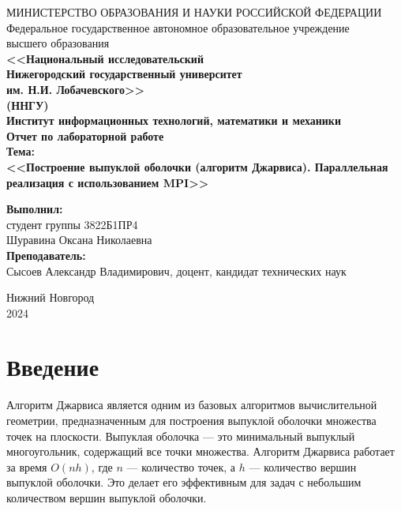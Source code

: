 \documentclass[12pt]{article}
\begin{document}
\begin{center}
МИНИСТЕРСТВО ОБРАЗОВАНИЯ И НАУКИ РОССИЙСКОЙ ФЕДЕРАЦИИ \\
Федеральное государственное автономное образовательное учреждение \\
высшего образования \\ \textbf{<<Национальный исследовательский \\ Нижегородский государственный университет \\
им. Н.И. Лобачевского>>} \\
\textbf{(ННГУ)} \\[0.5cm]
\textbf{Институт информационных технологий, математики и механики} \\[4.5cm]

\textbf{\large Отчет по лабораторной работе} \\[0.6cm] %
\textbf{Тема:} \\
\textbf{\large <<Построение выпуклой оболочки (алгоритм Джарвиса). Параллельная реализация с использованием MPI>>} \\[5.0cm]
\begin{flushright}
\begin{minipage}{0.40\textwidth} %
\begin{flushleft} %
\textbf{Выполнил:} \\[0.1cm]
студент группы 3822Б1ПР4 \\
Шуравина Оксана Николаевна \\[1.0cm]
\textbf{Преподаватель:} \\[0.1cm]
Сысоев Александр Владимирович, доцент, кандидат технических наук \\
\end{flushleft} %
\end{minipage} %
\end{flushright}
\vfill

Нижний Новгород \\
2024

\thispagestyle{empty}

\end{center}

\newpage
\section*{Введение}
\indent Алгоритм Джарвиса является одним из базовых алгоритмов вычислительной геометрии, предназначенным для построения выпуклой оболочки множества точек на плоскости. Выпуклая оболочка — это минимальный выпуклый многоугольник, содержащий все точки множества. Алгоритм Джарвиса работает за время \( O(nh) \), где \( n \) — количество точек, а \( h \) — количество вершин выпуклой оболочки. Это делает его эффективным для задач с небольшим количеством вершин выпуклой оболочки.
\end{document}
